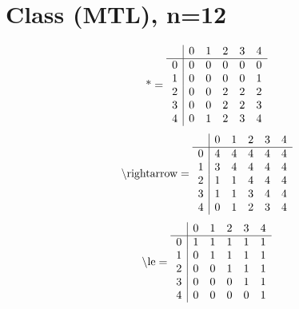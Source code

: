 \documentclass[11pt]{article}
\begin{document}
\section{Class (MTL), n=12}
\[\text{*} = 
\begin{array}{r | r r r r r}
 & 0 & 1 & 2 & 3 & 4 \\ \hline
0 & 0 & 0 & 0 & 0 & 0 \\
1 & 0 & 0 & 0 & 0 & 1 \\
2 & 0 & 0 & 2 & 2 & 2 \\
3 & 0 & 0 & 2 & 2 & 3 \\
4 & 0 & 1 & 2 & 3 & 4 \\
\end{array}
\]
\[\text{\textbackslash rightarrow} = 
\begin{array}{r | r r r r r}
 & 0 & 1 & 2 & 3 & 4 \\ \hline
0 & 4 & 4 & 4 & 4 & 4 \\
1 & 3 & 4 & 4 & 4 & 4 \\
2 & 1 & 1 & 4 & 4 & 4 \\
3 & 1 & 1 & 3 & 4 & 4 \\
4 & 0 & 1 & 2 & 3 & 4 \\
\end{array}
\]
\[\text{\textbackslash le} = 
\begin{array}{r | r r r r r}
 & 0 & 1 & 2 & 3 & 4 \\ \hline
0 & 1 & 1 & 1 & 1 & 1 \\
1 & 0 & 1 & 1 & 1 & 1 \\
2 & 0 & 0 & 1 & 1 & 1 \\
3 & 0 & 0 & 0 & 1 & 1 \\
4 & 0 & 0 & 0 & 0 & 1 \\
\end{array}
\]
\end{document}
